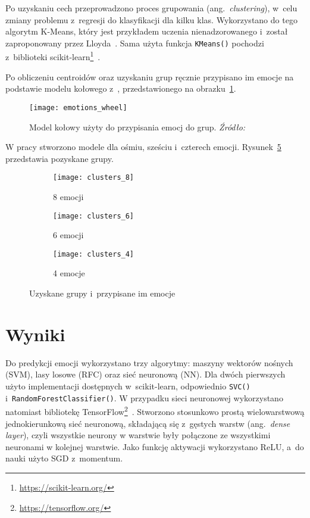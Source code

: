 Po uzyskaniu cech przeprowadzono proces grupowania (ang.~\textit{clustering}), w~celu zmiany problemu z~regresji do klasyfikacji dla kilku klas.
Wykorzystano do tego algorytm K-Means, który jest przykładem uczenia nienadzorowanego i~został zaproponowany przez Lloyda~\cite{Lloyd1982}.
Sama użyta funkcja \texttt{KMeans()} pochodzi z~biblioteki scikit-learn\footnote{\url{https://scikit-learn.org/}}~\cite{scikit-learn}.

Po obliczeniu centroidów oraz uzyskaniu grup ręcznie przypisano im emocje na podstawie modelu kołowego z~\cite{Kollias2019}, przedstawionego na obrazku~\ref{fig:emotions-wheel}.

\begin{figure}[h]
    \centering
    \texttt{[image: emotions\_wheel]}
    \caption{Model kołowy użyty do przypisania emocj do grup. \textit{Źródło:~\cite{Kollias2019}}}
    \label{fig:emotions-wheel}
\end{figure}

W pracy stworzono modele dla ośmiu, sześciu i~czterech emocji.
Rysunek~\ref{fig:clusters-all} przedstawia pozyskane grupy.

\begin{figure}[h!]
    \begin{subfigure}{0.5\textwidth}
        \centering
        \texttt{[image: clusters\_8]}
        \caption{8 emocji}
        \label{fig:clusters-8}
    \end{subfigure}
    \begin{subfigure}{0.5\textwidth}
        \centering
        \texttt{[image: clusters\_6]}
        \caption{6 emocji}
        \label{fig:clusters-6}
    \end{subfigure}
    \begin{subfigure}{0.5\textwidth}
        \centering
        \texttt{[image: clusters\_4]}
        \caption{4 emocje}
        \label{fig:clusters-4}
    \end{subfigure}
    \caption{Uzyskane grupy i~przypisane im emocje}
    \label{fig:clusters-all}
\end{figure}

\section{Wyniki}\label{sec:wyniki}

Do predykcji emocji wykorzystano trzy algorytmy: maszyny wektorów nośnych (SVM), lasy losowe (RFC) oraz sieć neuronową (NN).
Dla dwóch pierwszych użyto implementacji dostępnych w~scikit-learn, odpowiednio \texttt{SVC()} i~\texttt{RandomForestClassifier()}.
W przypadku sieci neuronowej wykorzystano natomiast bibliotekę TensorFlow\footnote{\url{https://tensorflow.org/}}~\cite{Tensorflow2015}.
Stworzono stosunkowo prostą wielowarstwową jednokierunkową sieć neuronową, składającą się z~gęstych warstw (ang.~\textit{dense layer}), czyli wszystkie neurony w warstwie były połączone ze wszystkimi neuronami w kolejnej warstwie.
Jako funkcję aktywacji wykorzystano ReLU, a~do nauki użyto SGD z~momentum.

